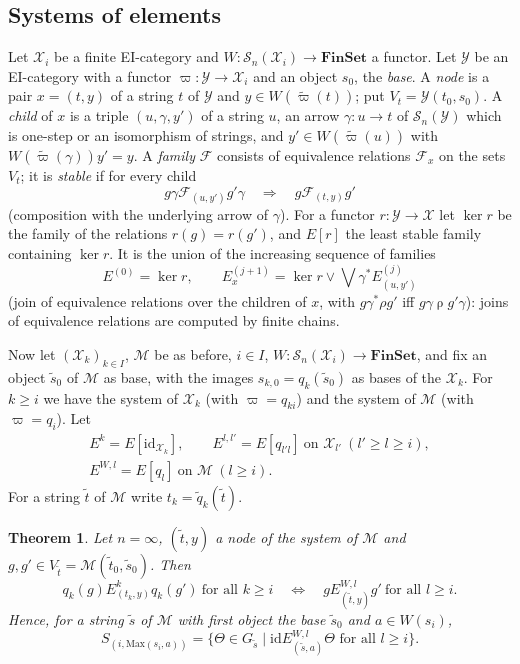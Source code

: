 \documentclass[11pt]{amsart}
\newtheorem{thm}{Theorem}[section]
\theoremstyle{definition}
\newcommand{\Fin}{\mathbf{FinSet}}
\newcommand{\Max}{\mathrm{Max}}
\newcommand{\cX}{\mathcal X}
\newcommand{\cM}{\mathcal M}
\newcommand{\cS}{\mathcal S}
\newcommand{\id}{\mathrm{id}}
\newcommand{\cY}{\mathcal Y}
\begin{document}
\subsection*{Systems of elements}
Let $\cX_i$ be a finite EI-category and $W\colon\cS_n(\cX_i)\to\Fin$ a
functor. Let $\cY$ be an EI-category with a functor $\varpi\colon\cY\to
\cX_i$ and an object $s_0$, the \emph{base}. A \emph{node} is a pair
$x=(t,y)$ of a string $t$ of $\cY$ and $y\in W(\tilde\varpi(t))$; put
$V_t=\cY(t_0,s_0)$. A \emph{child} of $x$ is a triple $(u,\gamma,y')$
of a string $u$, an arrow $\gamma\colon u\to t$ of $\cS_n(\cY)$ which
is one-step or an isomorphism of strings, and $y'\in W(\tilde\varpi(u))$
with $W(\tilde\varpi(\gamma))y'=y$. A \emph{family} $\mathcal F$
consists of equivalence relations $\mathcal F_x$ on the sets $V_t$;
it is \emph{stable} if for every child
\begin{equation}\label{eq:closed}
g\gamma\mathrel{\mathcal F_{(u,y')}}g'\gamma\quad\Longrightarrow\quad
g\mathrel{\mathcal F_{(t,y)}}g'
\end{equation}
(composition with the underlying arrow of $\gamma$). For a functor
$r\colon\cY\to\cX$ let $\ker r$ be the family of the relations
$r(g)=r(g')$, and $E[r]$ the least stable family containing $\ker r$.
It is the union of the increasing sequence of families
\[
E^{(0)}=\ker r,\qquad E^{(j+1)}_x=\ker r\vee\bigvee\gamma^*E^{(j)}_{
(u,y')}
\]
(join of equivalence relations over the children of $x$, with
$g\mathrel{\gamma^*\rho}g'$ iff $g\gamma\mathrel\rho g'\gamma$):
joins of equivalence relations are computed by finite chains.


Now let $(\cX_k)_{k\in I}$, $\cM$ be as before, $i\in I$,
$W\colon\cS_n(\cX_i)\to\Fin$, and fix an object $\tilde s_0$ of $\cM$
as base, with the images $s_{k,0}=q_k(\tilde s_0)$ as bases of the
$\cX_k$. For $k\ge i$ we have the system of $\cX_k$ (with
$\varpi=q_{ki}$) and the system of $\cM$ (with $\varpi=q_i$). Let
\begin{gather*}
E^k=E[\id_{\cX_k}],\qquad E^{l,l'}=E[q_{l'l}]\ \text{on }\cX_{l'}\
(l'\ge l\ge i),\\ E^{W,l}=E[q_l]\ \text{on }\cM\ (l\ge i).
\end{gather*}
For a string $\tilde t$ of $\cM$ write $t_k=\tilde q_k(\tilde t)$.

\begin{thm}\label{thm:main}
Let $n=\infty$, $(\tilde t,y)$ a node of the system of $\cM$ and
$g,g'\in V_{\tilde t}=\cM(\tilde t_0,\tilde s_0)$. Then
\[
q_k(g)\mathrel{E^k_{(t_k,y)}}q_k(g')\ \text{for all }k\ge i
\quad\Longleftrightarrow\quad
g\mathrel{E^{W,l}_{(\tilde t,y)}}g'\ \text{for all }l\ge i.
\]
Hence, for a string $\tilde s$ of $\cM$ with first object the base
$\tilde s_0$ and $a\in W(s_i)$,
\[
S_{(i,\Max(s_i,a))}=\{\Theta\in G_{\tilde s}\mid\id\mathrel{
E^{W,l}_{(\tilde s,a)}}\Theta\text{ for all }l\ge i\}.
\]
\end{thm}
\end{document}
